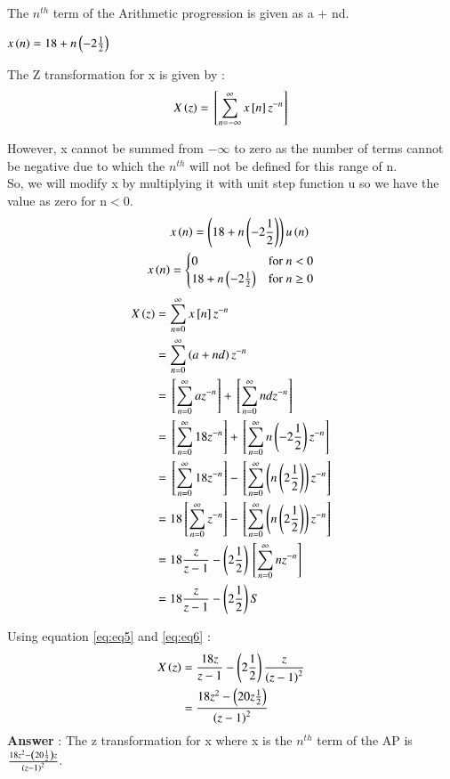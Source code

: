 \documentclass[journal,12pt,twocolumn]{IEEEtran}
\theoremstyle{remark}
\begin{document}
\vspace{4mm}

\textbf{} The $n^{th}$ term of the Arithmetic progression is given as a + nd.

$x\left(n\right) = 18 + n\left(-2\frac{1}{2}\right)$

The Z transformation for x is given by : \\
\begin{align}
X\left(z\right) ={}\left[\sum_{n=-\infty}^{\infty}x{}\left[n\right]z^{-n}\right]
\end{align}

However, x cannot be summed from $-\infty$ to zero as the number of terms cannot be negative due to which the $n^{th}$ will not be defined for this range of n.\\
So, we will modify x by multiplying it with unit step function u so we have the value as zero for n$<$0.
\begin{align}
&x\left(n\right) = \left(18 + n\left(-2\frac{1}{2}\right)\right)u\left(n\right) \\
     x\left(n\right) & = \begin{cases}
        0 & \text{for } n < 0 \\
        18 + n\left(-2\frac{1}{2}\right) & \text{for } n \geq 0
    \end{cases}
\end{align}
\begin{align}
X\left(z\right) &= \sum_{n=0}^{\infty}x{}\left[n\right]z^{-n}\\
 &= \sum_{n=0}^{\infty}\left(a + nd\right)z^{-n} \\
 &=  {}\left[\sum_{n=0}^{\infty}az^{-n}\right] + {}\left[\sum_{n=0}^{\infty}ndz^{-n}\right]\\
 &=  {}\left[\sum_{n=0}^{\infty}18z^{-n}\right] + {}\left[\sum_{n=0}^{\infty}n\left(-2\frac{1}{2}\right)z^{-n}\right]\\
 &=  {}\left[\sum_{n=0}^{\infty}18z^{-n}\right] - {}\left[\sum_{n=0}^{\infty}\left(n\left(2\frac{1}{2}\right)\right)z^{-n} \right]\\
 &= 18{}\left[\sum_{n=0}^{\infty}z^{-n}\right] - {}\left[\sum_{n=0}^{\infty}\left(n\left(2\frac{1}{2}\right)\right)z^{-n}\right]\label{eq:eq8}\\ 
 &= 18\frac{z}{z-1} - \left(2\frac{1}{2}\right){}\left[\sum_{n=0}^{\infty}nz^{-n}\right]\\
 &= 18\frac{z}{z-1} - \left(2\frac{1}{2}\right)S \label{eq:eq6}
\end{align}

Using equation \eqref{eq:eq5} and \eqref{eq:eq6} : \\
\begin{align}
X\left(z\right) &=  \frac{18z}{z-1} - \left(2\frac{1}{2}\right)\frac{z}{\left(z-1\right)^2}\\
&= \frac{18z^{2} - \left(20z\frac{1}{2}\right)}{\left(z-1\right)^2}
\end{align}
\large\textbf{Answer} : \normalsize The z transformation for x where x is the $n^{th}$ term of the AP is $\frac{18z^{2} - \left(20\frac{1}{2}\right)z}{\left(z-1\right)^2}$.
\end{document}
